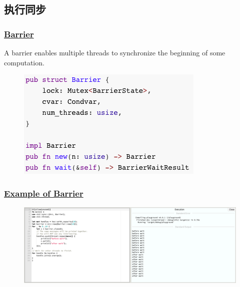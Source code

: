 \subsection{执行同步} %
\begin{frame}[fragile]
    \frametitle{\href{https://doc.rust-lang.org/std/sync/struct.Barrier.html}{Barrier}}

A barrier enables multiple threads to synchronize the beginning of some computation. \pause

    \begin{figure}
    \includegraphics[width=0.6\linewidth]{figs/struct-barrier.png}
    \end{figure}

\end{frame}
% 
% 
% 
% 
% 
% 
\begin{frame}[fragile]
    \frametitle{\href{https://doc.rust-lang.org/std/sync/struct.Barrier.html}{Example of Barrier}}
    \begin{figure}
    \includegraphics[width=1.0\linewidth]{figs/demo-barrier.png}
    \end{figure}

\end{frame}
